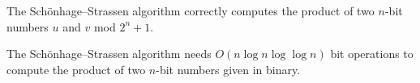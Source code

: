 \documentclass[a4paper]{article}
\begin{document}
\begin{theorem}
The Schönhage–Strassen algorithm correctly computes the product of two $n$-bit numbers $u$ and $v$ mod $2^{n} + 1$.
\end{theorem}


\begin{theorem}
The Schönhage–Strassen algorithm needs $O(n \log{n} \log{\log{n}})$ bit operations to compute the product of two $n$-bit numbers given in binary.
\end{theorem}
\end{document}
